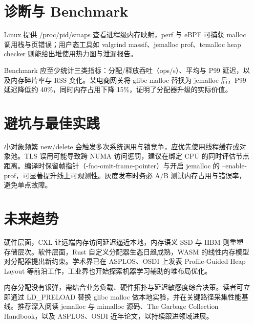 \chapter{诊断与 Benchmark}
Linux 提供 /proc/pid/smaps 查看进程级内存映射，perf 与 eBPF 可捕获 malloc 调用栈与页错误；用户态工具如 valgrind massif、jemalloc prof、tcmalloc heap checker 则能给出堆使用热力图与泄漏报告。\par
Benchmark 应至少统计三类指标：分配/释放吞吐（ops/s）、平均与 P99 延迟，以及内存碎片率与 RSS 变化。某电商网关将 glibc malloc 替换为 jemalloc 后，P99 延迟降低约 40\%{}，同时内存占用下降 15\%{}，证明了分配器升级的实际价值。\par
\chapter{避坑与最佳实践}
小对象频繁 new/delete 会触发多次系统调用与锁竞争，应优先使用线程缓存或对象池。TLS 误用可能导致跨 NUMA 访问惩罚，建议在绑定 CPU 的同时评估节点距离。编译时保留帧指针（-fno-omit-frame-pointer）与开启 jemalloc 的 --enable-prof，可显著提升线上可观测性。灰度发布时务必 A/B 测试内存占用与错误率，避免单点故障。\par
\chapter{未来趋势}
硬件层面，CXL 让远端内存访问延迟逼近本地，内存语义 SSD 与 HBM 则重塑存储层次。软件层面，Rust 自定义分配器生态日趋成熟，WASM 的线性内存模型对分配器提出新约束。学术界已在 ASPLOS、OSDI 上发表 Profile-Guided Heap Layout 等前沿工作，工业界也开始探索机器学习辅助的堆布局优化。\par
内存分配没有银弹，需结合业务负载、硬件拓扑与延迟敏感度综合决策。读者可立即通过 LD\_{}PRELOAD 替换 glibc malloc 做本地实验，并在关键路径采集性能基线。推荐深入阅读 jemalloc 与 mimalloc 源码、The Garbage Collection Handbook，以及 ASPLOS、OSDI 近年论文，以持续跟进领域进展。\par
